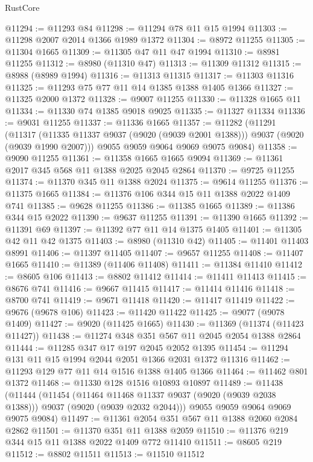\begin{lexlean}{RustCore}
\begin{coremodule}
@11294 := @11293 @84
@11298 := @11294 @78 @11 @15 @1994
@11303 := @11298 @2007 @2014 @1366 @1989 @1372
@11304 := @8972 @11255
@11305 := @11304 @1665
@11309 := @11305 @47 @11 @47 @1994
@11310 := @8981 @11255
@11312 := @8980 (@11310 @47)
@11313 := @11309 @11312
@11315 := @8988 (@8989 @1994)
@11316 := @11313 @11315
@11317 := @11303 @11316
@11325 := @11293 @75 @77 @11 @14 @1385 @1388 @1405 @1366
@11327 := @11325 @2000 @1372
@11328 := @9007 @11255
@11330 := @11328 @1665 @11
@11334 := @11330 @74 @1385 @9018 @9025
@11335 := @11327 @11334
@11336 := @9031 @11255
@11337 := @11336 @1665
@11357 := @11282
    (@11291
      (@11317 (@11335 @11337 @9037 (@9020 (@9039 @2001 @1388))) @9037 (@9020 (@9039 @1990 @2007)))
      @9055
      @9059
      @9064
      @9069
      @9075
      @9084)
@11358 := @9090 @11255
@11361 := @11358 @1665 @1665 @9094
@11369 := @11361 @2017 @345 @568 @11 @1388 @2025 @2045 @2864
@11370 := @9725 @11255
@11374 := @11370 @345 @11 @1388 @2024
@11375 := @9614 @11255
@11376 := @11375 @1665
@11384 := @11376 @106 @344 @15 @11 @1388 @2022 @1409 @741
@11385 := @9628 @11255
@11386 := @11385 @1665
@11389 := @11386 @344 @15 @2022
@11390 := @9637 @11255
@11391 := @11390 @1665
@11392 := @11391 @69
@11397 := @11392 @77 @11 @14 @1375 @1405
@11401 := @11305 @42 @11 @42 @1375
@11403 := @8980 (@11310 @42)
@11405 := @11401 @11403 @8991
@11406 := @11397 @11405
@11407 := @9657 @11255
@11408 := @11407 @1665
@11410 := @11389 (@11406 @11408)
@11411 := @11384 @11410
@11412 := @8605 @106
@11413 := @8802 @11412
@11414 := @11411 @11413
@11415 := @8676 @741
@11416 := @9667 @11415
@11417 := @11414 @11416
@11418 := @8700 @741
@11419 := @9671 @11418
@11420 := @11417 @11419
@11422 := @9676 (@9678 @106)
@11423 := @11420 @11422
@11425 := @9077 (@9078 @1409)
@11427 := @9020 (@11425 @1665)
@11430 := @11369 (@11374 (@11423 @11427))
@11438 := @11274 @348 @351 @567 @11 @2045 @2054 @1388 @2864
@11444 := @11285 @347 @17 @197 @2045 @2052 @1395
@11454 := @11294 @131 @11 @15 @1994 @2044 @2051 @1366 @2031 @1372 @11316
@11462 := @11293 @129 @77 @11 @14 @1516 @1388 @1405 @1366
@11464 := @11462 @801 @1372
@11468 := @11330 @128 @1516 @10893 @10897
@11489 := @11438
    (@11444
      (@11454
        (@11464 @11468 @11337 @9037 (@9020 (@9039 @2038 @1388)))
        @9037
        (@9020 (@9039 @2032 @2044)))
      @9055
      @9059
      @9064
      @9069
      @9075
      @9084)
@11497 := @11361 @2054 @351 @567 @11 @1388 @2060 @2084 @2862
@11501 := @11370 @351 @11 @1388 @2059
@11510 := @11376 @219 @344 @15 @11 @1388 @2022 @1409 @772 @11410
@11511 := @8605 @219
@11512 := @8802 @11511
@11513 := @11510 @11512

\end{coremodule}
\end{lexlean}
